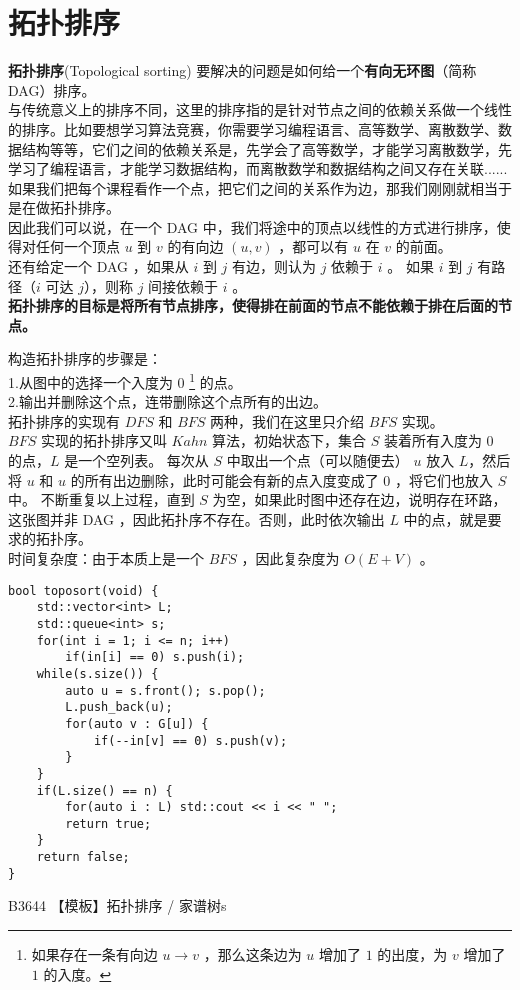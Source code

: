 \documentclass{beamer}
\newcommand{\fdf}[1]{\alert{\textbf{#1}}}
\begin{document}
\section{拓扑排序}
\begin{frame}
\fdf{拓扑排序}(Topological sorting) 要解决的问题是如何给一个\fdf{有向无环图}（简称DAG）排序。\\ 
与传统意义上的排序不同，这里的排序指的是针对节点之间的依赖关系做一个线性的排序。比如要想学习算法竞赛，你需要学习编程语言、高等数学、离散数学、数据结构等等，它们之间的依赖关系是，先学会了高等数学，才能学习离散数学，先学习了编程语言，才能学习数据结构，而离散数学和数据结构之间又存在关联......如果我们把每个课程看作一个点，把它们之间的关系作为边，那我们刚刚就相当于是在做拓扑排序。\\ 
因此我们可以说，在一个 DAG 中，我们将途中的顶点以线性的方式进行排序，使得对任何一个顶点 $u$ 到 $v$ 的有向边 $(u, v)$ ，都可以有 $u$ 在 $v$ 的前面。 \\
还有给定一个 DAG ，如果从 $i$ 到 $j$ 有边，则认为 $j$ 依赖于 $i$ 。 如果 $i$ 到 $j$ 有路径（$i$ 可达 $j$），则称 $j$ 间接依赖于 $i$ 。 \\ 
\fdf{拓扑排序的目标是将所有节点排序，使得排在前面的节点不能依赖于排在后面的节点。}
\end{frame}
\begin{frame}
构造拓扑排序的步骤是：\\ 
1.从图中的选择一个入度为 $0$ \footnote{如果存在一条有向边 $u \rightarrow v$ ，那么这条边为 $u$ 增加了 $1$ 的出度，为 $v$ 增加了 $1$ 的入度。} 的点。 \\
2.输出并删除这个点，连带删除这个点所有的出边。	 \\ 
拓扑排序的实现有 $DFS$ 和 $BFS$ 两种，我们在这里只介绍 $BFS$ 实现。 \\ 
$BFS$ 实现的拓扑排序又叫 $Kahn$ 算法，初始状态下，集合 $S$ 装着所有入度为 $0$ 的点，$L$ 是一个空列表。
每次从 $S$ 中取出一个点（可以随便去） $u$ 放入 $L$，然后将 $u$ 和 $u$ 的所有出边删除，此时可能会有新的点入度变成了 $0$ ，将它们也放入 $S$ 中。 不断重复以上过程，直到 $S$ 为空，如果此时图中还存在边，说明存在环路，这张图并非 DAG ，因此拓扑序不存在。否则，此时依次输出 $L$ 中的点，就是要求的拓扑序。  \\ 
时间复杂度：由于本质上是一个 $BFS$ ，因此复杂度为 $O(E + V)$ 。
\end{frame}
\begin{frame}[fragile]
\begin{onlyenv}
\begin{verbatim}
bool toposort(void) {
    std::vector<int> L;
    std::queue<int> s;
    for(int i = 1; i <= n; i++)
        if(in[i] == 0) s.push(i);
    while(s.size()) {
        auto u = s.front(); s.pop();
        L.push_back(u);
        for(auto v : G[u]) {
            if(--in[v] == 0) s.push(v);
        }
    }
    if(L.size() == n) {
        for(auto i : L) std::cout << i << " ";
        return true;
    }
    return false;
}
\end{verbatim}
\end{onlyenv}
\end{frame}
\begin{frame}
B3644 【模板】拓扑排序 / 家谱树s
\end{frame}
\end{document}
